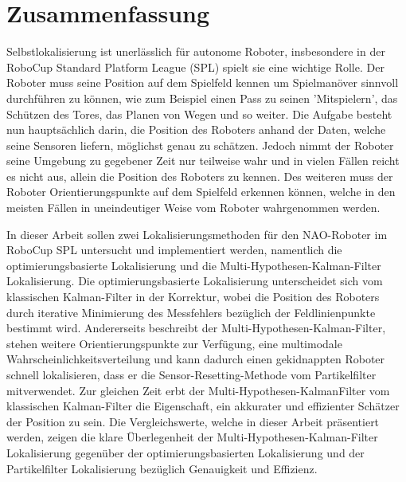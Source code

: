 \thispagestyle{empty}
\chapter*{Zusammenfassung}

Selbstlokalisierung ist unerl{\"a}sslich f{\"u}r autonome Roboter, insbesondere in der RoboCup Standard Platform League (SPL) spielt sie eine wichtige Rolle. Der Roboter muss seine Position auf dem Spielfeld kennen um Spielman{\"o}ver sinnvoll durchf{\"u}hren zu k{\"o}nnen, wie zum Beispiel einen Pass zu seinen 'Mitspielern', das Sch{\"u}tzen des Tores, das Planen von Wegen und so weiter. Die Aufgabe besteht nun haupts{\"a}chlich darin, die Position des Roboters anhand der Daten, welche seine Sensoren liefern, m{\"o}glichst genau zu sch{\"a}tzen. Jedoch nimmt der Roboter seine Umgebung zu gegebener Zeit nur teilweise wahr und in vielen F{\"a}llen reicht es nicht aus, allein die Position des Roboters zu kennen. Des weiteren muss der Roboter Orientierungspunkte auf dem Spielfeld erkennen k{\"o}nnen, welche in den meisten F{\"a}llen in uneindeutiger Weise vom Roboter wahrgenommen werden.

In dieser Arbeit sollen zwei Lokalisierungsmethoden f{\"u}r den NAO-Roboter im RoboCup SPL untersucht und implementiert werden, namentlich die optimierungsbasierte Lokalisierung und die Multi-Hypothesen-Kalman-Filter Lokalisierung. Die optimierungsbasierte Lokalisierung unterscheidet sich vom klassischen Kalman-Filter in der Korrektur, wobei die Position des Roboters durch iterative Minimierung des Messfehlers bez{\"u}glich der Feldlinienpunkte bestimmt wird. Andererseits beschreibt der Multi-Hypothesen-Kalman-Filter, stehen weitere Orientierungspunkte zur Verf{\"u}gung, eine multimodale Wahrscheinlichkeitsverteilung und kann dadurch einen gekidnappten Roboter schnell lokalisieren, dass er die Sensor-Resetting-Methode vom Partikelfilter mitverwendet. Zur gleichen Zeit erbt der Multi-Hypothesen-KalmanFilter vom klassischen Kalman-Filter die Eigenschaft, ein akkurater und effizienter Sch{\"a}tzer der Position zu sein. Die Vergleichswerte, welche in dieser Arbeit pr{\"a}sentiert werden, zeigen die klare {\"U}berlegenheit der Multi-Hypothesen-Kalman-Filter Lokalisierung gegen{\"u}ber der optimierungsbasierten Lokalisierung und der Partikelfilter Lokalisierung bez{\"u}glich Genauigkeit und Effizienz.
